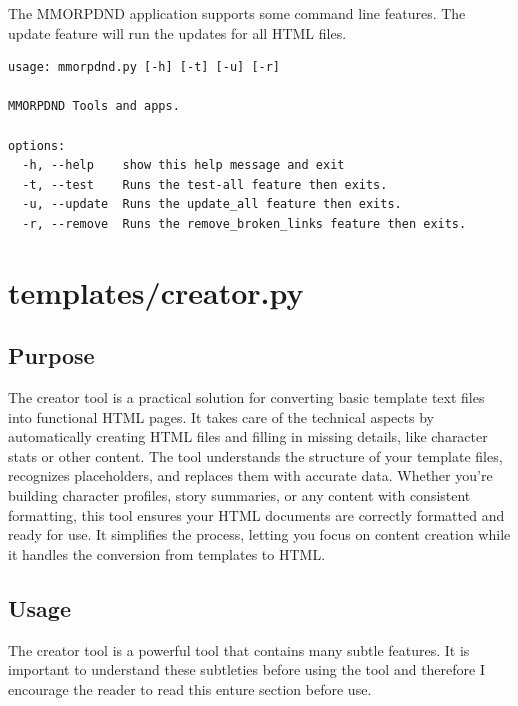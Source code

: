 The MMORPDND application supports some command line features. The update feature will run the updates for all HTML files.

\begin{lstlisting}
usage: mmorpdnd.py [-h] [-t] [-u] [-r]

MMORPDND Tools and apps.

options:
  -h, --help    show this help message and exit
  -t, --test    Runs the test-all feature then exits.
  -u, --update  Runs the update_all feature then exits.
  -r, --remove  Runs the remove_broken_links feature then exits.
\end{lstlisting}

















\section{templates/creator.py}



\subsection{Purpose}

The creator tool is a practical solution for converting basic template text files into functional HTML pages. It takes care of the technical aspects by automatically creating HTML files and filling in missing details, like character stats or other content. The tool understands the structure of your template files, recognizes placeholders, and replaces them with accurate data. Whether you're building character profiles, story summaries, or any content with consistent formatting, this tool ensures your HTML documents are correctly formatted and ready for use. It simplifies the process, letting you focus on content creation while it handles the conversion from templates to HTML.

\subsection{Usage}

The creator tool is a powerful tool that contains many subtle features. It is important to understand these subtleties before using the tool and therefore I encourage the reader to read this enture section before use. 

